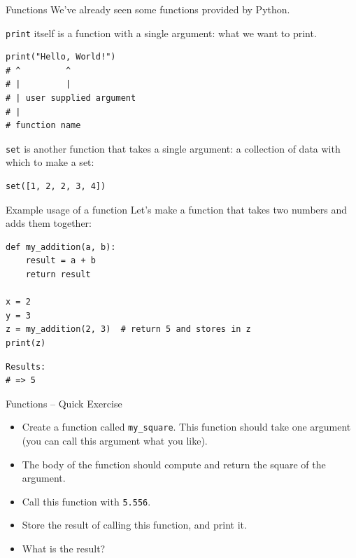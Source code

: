\documentclass[10pt]{beamer}
\begin{document}
\begin{frame}[label={sec:org4421f62},fragile]{Functions}
 We've already seen some functions provided by Python.

\texttt{print} itself is a function with a single argument: what we want to print.

\begin{verbatim}
print("Hello, World!")
# ^         ^
# |         |
# | user supplied argument
# |
# function name 
\end{verbatim}

\texttt{set} is another function that takes a single argument: a collection of data with which
to make a set:

\begin{verbatim}
set([1, 2, 2, 3, 4])
\end{verbatim}
\end{frame}

\begin{frame}[label={sec:orgd53b807},fragile]{Example usage of a function}
 Let's make a function that takes two numbers and adds them together:

\begin{verbatim}
def my_addition(a, b):
    result = a + b
    return result

x = 2
y = 3
z = my_addition(2, 3)  # return 5 and stores in z
print(z)
\end{verbatim}

\begin{verbatim}
Results: 
# => 5
\end{verbatim}
\end{frame}

\begin{frame}[label={sec:orgadb9004},fragile]{Functions -- Quick Exercise}
 \begin{itemize}
\item Create a function called \texttt{my\_square}. This function should take one argument (you can
call this argument what you like).
\item The body of the function should compute and return the square of the argument.
\item Call this function with \texttt{5.556}.
\item Store the result of calling this function, and print it.
\item What is the result?
\end{itemize}
\end{frame}
\end{document}
